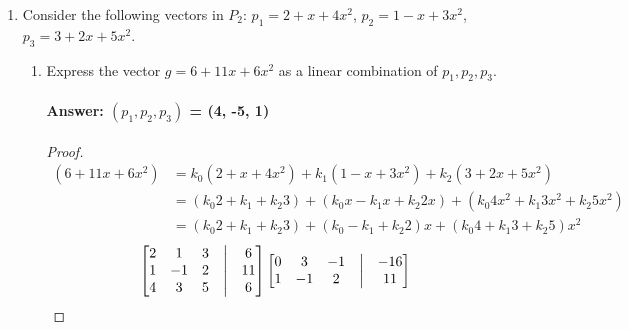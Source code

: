 \documentclass[12pt]{article}
\begin{document}
\begin{enumerate}
\begin{enumerate}
\begin{proof}
                                    so $W$ is a subspace of $M_{nn}$.
                            \end{proof}
              \end{enumerate}

        \item Consider the following vectors in $P_2$: $p_1 = 2 + x + 4x^2$, $p_2 = 1 - x + 3x^2$, $p_3 = 3 + 2x + 5x^2$.
              \begin{enumerate}
                      \item Express the vector $g = 6 + 11x + 6x^2$ as a linear combination of $p_1,p_2,p_3$.
                            \paragraph{Answer: $(p_1,p_2,p_3)$ = (4, -5, 1)}
                            \begin{proof}
                                    \begin{align*}
                                            (6 + 11x + 6x^2) & =  k_{0}(2 + x + 4x^2) +  k_{1}(1 - x + 3x^2) +  k_{2}(3 + 2x + 5x^2)                                \\
                                                             & =  (k_{0}2 + k_{1} + k_{2}3)  +  (k_{0}x - k_{1}x + k_{2}2x)  +  (k_{0}4x^2 + k_{1}3x^2 + k_{2}5x^2) \\
                                                             & =  (k_{0}2 + k_{1} + k_{2}3)  +  (k_{0} - k_{1} + k_{2}2)x    +  (k_{0}4 + k_{1}3 + k_{2}5)x^2
                                    \end{align*}
                                    \begin{align*}
                                            \begin{bmatrix}
                                                    2 & 1  & 3 & \bigm| & 6  \\
                                                    1 & -1 & 2 & \bigm| & 11 \\
                                                    4 & 3  & 5 & \bigm| & 6  \\
                                            \end{bmatrix}
                                            \begin{bmatrix}
                                                    0 & 3  & -1 & \bigm| & -16 \\
                                                    1 & -1 & 2  & \bigm| & 11  \\

\end{bmatrix}
\end{align*}
\end{proof}
\end{enumerate}
\end{enumerate}
\end{document}
